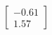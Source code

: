 \documentclass[preview]{standalone}
\begin{document}
\begin{align*}
\begin{bmatrix} -0.61 \\ 1.57 \end{bmatrix}
\end{align*}
\end{document}
